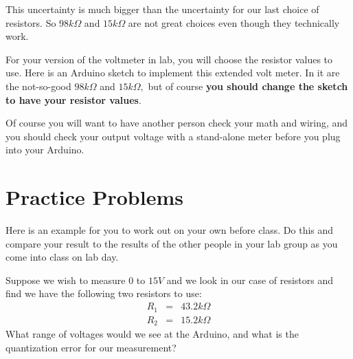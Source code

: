 This uncertainty is much bigger than the uncertainty for our last choice of
resistors. So $98\unit{k%
\Omega%
}$ and $15\unit{k%
\Omega%
}$ are not great choices even though they technically work.

For your version of the voltmeter in lab, you will choose the resistor
values to use. Here is an Arduino sketch to implement this extended volt
meter. In it are the not-so-good $98\unit{k%
\Omega%
}$ and $15\unit{k%
\Omega%
},$ but of course \textbf{you should change the sketch to have your resistor
values}.



\bigskip Of course you will want to have another person check your math and
wiring, and you should check your output voltage with a stand-alone meter
before you plug into your Arduino.

\section{Practice Problems}

Here is an example for you to work out on your own before class. Do this and
compare your result to the results of the other people in your lab group as
you come into class on lab day.

Suppose we wish to measure $0$ to $15\unit{V}$ and we look in our case of
resistors and find we have the following two resistors to use:%
\begin{eqnarray*}
R_{1} &=&43.2\unit{k%
\Omega%
} \\
R_{2} &=&15.2\unit{k%
\Omega%
}
\end{eqnarray*}%
What range of voltages would we see at the Arduino, and what is the
quantization error for our measurement?


